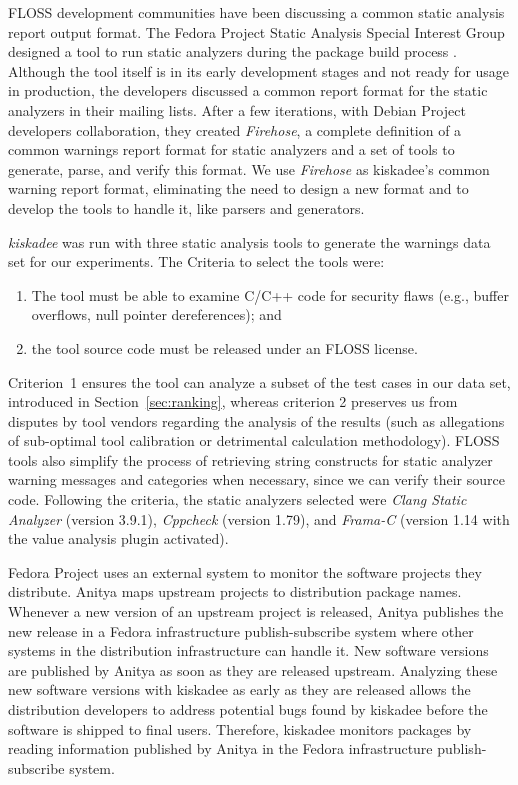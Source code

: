 FLOSS development communities have been discussing a common static analysis
report output format. The Fedora Project Static Analysis Special Interest Group
\cite{fedora:static:sig} designed a tool to run static analyzers during the
package build process \cite{fedora:mockwithanalysis}.  Although the tool itself
is in its early development stages and not ready for usage in production, the
developers discussed \cite{fedora:mlist} a common report format for the static
analyzers in their mailing lists. After a few iterations, with Debian Project
developers collaboration, they created \textit{Firehose}, a complete definition
of a common warnings report format for static analyzers and a set of tools to
generate, parse, and verify this format.  We use \textit{Firehose} as kiskadee's
common warning report format, eliminating the need to design a new format and
to develop the tools to handle it, like parsers and generators.

\textit{kiskadee} was run with three static analysis tools to generate the
warnings data set for our experiments. The Criteria to select the tools were:
\begin{enumerate}
  \item The tool must be able to examine C/C++ code for security flaws (e.g., buffer overflows, null pointer dereferences); and
  \item the tool source code must be released under an FLOSS license.
\end{enumerate}
Criterion~1 ensures the tool can analyze a subset of the test cases in our data
set, introduced in Section~\ref{sec:ranking}, whereas criterion 2 preserves us
from disputes by tool vendors regarding the analysis of the results (such as
allegations of sub-optimal tool calibration or detrimental calculation
methodology). FLOSS tools also simplify the process of retrieving string
constructs for static analyzer warning messages and categories when necessary,
since we can verify their source code. Following the criteria, the static
analyzers selected were \emph{Clang Static Analyzer} (version 3.9.1),
\emph{Cppcheck} (version 1.79), and \emph{Frama-C} (version 1.14 with the value
analysis plugin activated).

Fedora Project uses an external system to monitor the software projects they
distribute. Anitya \cite{anitya} maps upstream projects to distribution package
names. Whenever a new version of an upstream project is released, Anitya
publishes the new release in a Fedora infrastructure publish-subscribe system
where other systems in the distribution infrastructure can handle it.
New software versions are published by Anitya as soon as they are released
upstream. Analyzing these new software versions with kiskadee as early as they
are released allows the distribution developers to address potential bugs found
by kiskadee before the software is shipped to final users. Therefore, kiskadee
monitors packages by reading information published by Anitya in the Fedora
infrastructure publish-subscribe system.

